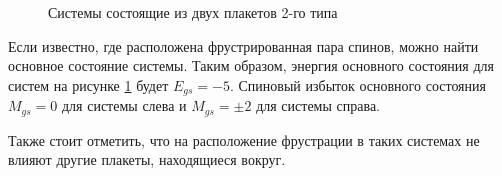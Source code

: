 \documentclass[utf8, babel, sor, jor, amsmath, amssymb, reprint]{elsarticle} %
\begin{document}
\begin{figure}[H]
	\centering
	\begin{minipage}{0.3\textwidth}
		\centering
		\label{fig:Type2_3x2}
	\end{minipage}
	\hspace{20pt} 
	\begin{minipage}{0.3\textwidth}
		\centering
		\label{fig:Type2_3x2_2}
	\end{minipage}
	\caption{Системы состоящие из двух плакетов 2-го типа}
	\label{fig:Type2_32}
\end{figure}


Если известно, где расположена фрустрированная пара спинов, можно найти основное состояние системы. Таким образом, энергия основного состояния для систем на рисунке \ref{fig:Type2_32} будет $E_{gs}=-5$. Спиновый избыток основного состояния $M_{gs}=0$ для системы слева и $M_{gs}=\pm 2$ для системы справа.

Также стоит отметить, что на расположение фрустрации в таких системах  не влияют другие плакеты, находящиеся вокруг.
\end{document}
